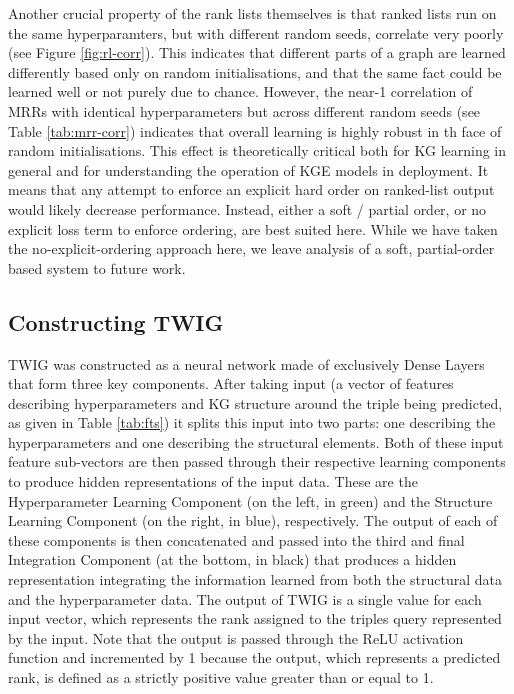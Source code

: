 Another crucial property of the rank lists themselves is that ranked lists run on the same hyperparamters, but with different random seeds, correlate very poorly (see Figure \ref{fig:rl-corr}). This indicates that different parts of a graph are learned differently based only on random initialisations, and that the same fact could be learned well or not purely due to chance. However, the near-1 correlation of MRRs with identical hyperparameters but across different random seeds (see Table \ref{tab:mrr-corr}) indicates that overall learning is highly robust in th face of random initialisations. This effect is theoretically critical both for KG learning in general and for understanding the operation of KGE models in deployment. It means that any attempt to enforce an explicit hard order on ranked-list output would likely decrease performance. Instead, either a soft / partial order, or no explicit loss term to enforce ordering, are best suited here. While we have taken the no-explicit-ordering approach here, we leave analysis of a soft, partial-order based system to future work.

\subsection{Constructing TWIG}
TWIG was constructed as a neural network made of exclusively Dense Layers that form three key components. After taking input (a vector of features describing hyperparameters and KG structure around the triple being predicted, as given in Table \ref{tab:fts}) it splits this input into two parts: one describing the hyperparameters and one describing the structural elements. Both of these input feature sub-vectors are then passed through their respective learning components to produce hidden representations of the input data. These are the Hyperparameter Learning Component (on the left, in green) and the Structure Learning Component (on the right, in blue), respectively. The output of each of these components is then concatenated and passed into the third and final Integration Component (at the bottom, in black) that produces a hidden representation integrating the information learned from both the structural data and the hyperparameter data. The output of TWIG is a single value for each input vector, which represents the rank assigned to the triples query represented by the input. Note that the output is passed through the ReLU activation function and incremented by 1 because the output, which represents a predicted rank, is defined as a strictly positive value greater than or equal to 1.  

